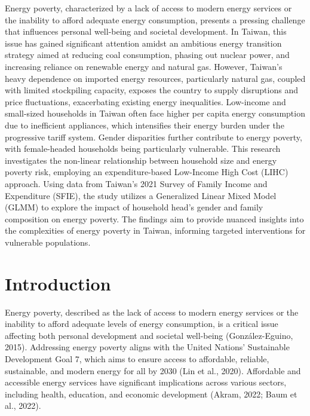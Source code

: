 \documentclass[
  twoside,
  openright,
  degree    = master,               %
  language  = english,              %
  fontset   = overleaf,             %
  watermark = true,                 %
  doi       = true,                 %
]{ntuthesis}
\begin{document}
\begin{abstract*}{\enstretch
Energy poverty, characterized by a lack of access to modern energy
services or the inability to afford adequate energy consumption,
presents a pressing challenge that influences personal well-being and
societal development. In Taiwan, this issue has gained significant
attention amidst an ambitious energy transition strategy aimed at
reducing coal consumption, phasing out nuclear power, and increasing
reliance on renewable energy and natural gas. However, Taiwan's heavy
dependence on imported energy resources, particularly natural gas,
coupled with limited stockpiling capacity, exposes the country to supply
disruptions and price fluctuations, exacerbating existing energy
inequalities. Low-income and small-sized households in Taiwan often face
higher per capita energy consumption due to inefficient appliances,
which intensifies their energy burden under the progressive tariff
system. Gender disparities further contribute to energy poverty, with
female-headed households being particularly vulnerable. This research
investigates the non-linear relationship between household size and
energy poverty risk, employing an expenditure-based Low-Income High Cost
(LIHC) approach. Using data from Taiwan's 2021 Survey of Family Income
and Expenditure (SFIE), the study utilizes a Generalized Linear Mixed
Model (GLMM) to explore the impact of household head's gender and family
composition on energy poverty. The findings aim to provide nuanced
insights into the complexities of energy poverty in Taiwan, informing
targeted interventions for vulnerable populations.
\par}\end{abstract*}

\maketableofcontents                %
\makelistoffigures                  %
\makelistoftables                   %

\mainmatter

\hypertarget{sec:introduction}{%
\chapter{Introduction}\label{sec:introduction}}

Energy poverty, described as the lack of access to modern energy
services or the inability to afford adequate levels of energy
consumption, is a critical issue affecting both personal development and
societal well-being (González-Eguino, 2015). Addressing energy poverty
aligns with the United Nations' Sustainable Development Goal 7, which
aims to ensure access to affordable, reliable, sustainable, and modern
energy for all by 2030 (Lin et al., 2020). Affordable and accessible
energy services have significant implications across various sectors,
including health, education, and economic development (Akram, 2022; Baum
et al., 2022).
\end{document}
